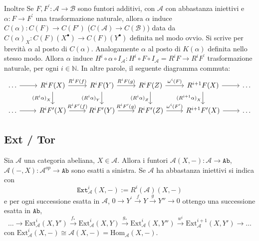\begin{remark}{}
Inoltre Se \(F, F^{\prime} : \mathcal{A} \to \mathcal{B}\) sono funtori
additivi, con \(\mathcal{A}\) con abbastanza iniettivi e \(\alpha : F \to
F^{\prime}\) una trasformazione naturale, allora \(\alpha\)  induce
\(C{(\alpha)} : C{(F)} \to C{(F')}\) (\(C{(\mathcal{A})} \to C{(\mathcal{B})}\))
data da \(C{(\alpha)}_X : C{(F)}{(X^\bullet)} \to C{(F)}{(Y^\bullet)}\) definita
nel modo ovvio. Si scrive per brevità \(\alpha\) al posto di \(C{(\alpha)}\).
Analogamente \(\alpha\) al posto di \(K{(\alpha)}\) definita nello stesso modo.
Allora \(\alpha\) induce \(H^{i} \circ \alpha \circ I_{\mathcal{A}}: H^{i}
\circ F \circ I_\mathcal{A} = R^{i}F \to R^{i}F^{\prime}\) trasformazione
naturale, per ogni \(i \in \mathbb{N}\). In altre parole, il seguente diagramma
commuta:
\[ \begin{tikzcd}
	\dots& R^{i}F{(X)} & R^{i}F{(Y)} & R^{i}F{(Z)} & R^{i+1}F{(X)} & \dots \\
    \dots& R^{i}F'{(X)} & R^{i}F'{(Y)} & R^{i}F'{(Z)} &
         R^{i+1}F'{(X)}& \dots
	\arrow[from=1-1, to=1-2]
	\arrow["R^{i}F{(f)}", from=1-2, to=1-3]
	\arrow["R^{i}F'{(f)}", from=2-2, to=2-3]
	\arrow["R^{i}F{(g)}", from=1-3, to=1-4]
	\arrow["{(R^{i}\alpha)}_X"', from=1-2, to=2-2]
	\arrow["{(R^{i}\alpha)}_Y"', from=1-3, to=2-3]
	\arrow["\omega^{i}{(F)}", from=1-4, to=1-5]
	\arrow["{(R^{i}\alpha)}_Z"', from=1-4, to=2-4]
	\arrow[from=1-5, to=1-6]
	\arrow["{(R^{i+1}\alpha)}_X"', from=1-5, to=2-5]
	\arrow[from=2-1, to=2-2]
	\arrow["R^{i}F'{(g)}", from=2-3, to=2-4]
	\arrow["\omega^{i}{(F^{\prime})}", from=2-4, to=2-5]
	\arrow[from=2-5, to=2-6]
\end{tikzcd} \]
\end{remark}

\subsection{Ext / Tor}

   Sia \(\mathcal{A}\) una categoria abeliana, \(X \in \mathcal{A}\). Allora i
   funtori \(\mathcal{A}{(X, -)} : \mathcal{A} \to \mathtt{Ab}\),
   \(\mathcal{A}{(-, X)} : \mathcal{A}^{op} \to \mathtt{Ab}\) sono esatti a
   sinistra. Se \(\mathcal{A}\) ha abbastanza iniettivi si indica con 
   \[
     \mathtt{Ext}_{\mathcal{A}}^{i}{(X, -)} := R^{i}{(\mathcal{A})}{(X, -)}
   \]
   e per ogni successione esatta in \(\mathcal{A}\), \(0 \to Y^{\prime}
   \overset{f}{\to} Y \overset{g}{\to} Y'' \to 0\) ottengo una successione
   esatta in \(\mathtt{Ab}\), 
   \[
     \dots \to \mathrm{Ext}_{\mathcal{A}} ^{i}{(X, Y')} \overset{f_*}{\to}
     \mathrm{Ext}_\mathcal{A}^{i}{(X, Y)} \overset{g_*}{\to}
     \mathrm{Ext}_\mathcal{A}^{i}{(X, Y'')} \overset{w^{i}}{\to}
     \mathrm{Ext}_\mathcal{A}^{i+1}{(X, Y')} \to \dots
   \]
   con \(\mathrm{Ext}_\mathcal{A}^{i}{(X, -)} \cong \mathcal{A}{(X, -)} =
   \mathrm{Hom}_\mathcal{A}{(X, -)}\).

